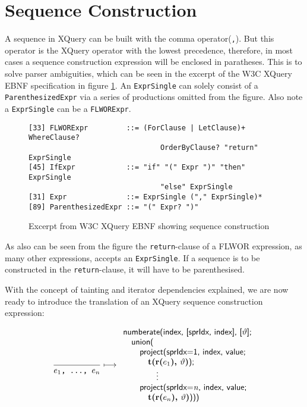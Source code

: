\section{Sequence Construction}
\label{sect:trans:TD:seqBuild}

A sequence in XQuery can be built with the comma operator(\texttt{,}). But this operator is the XQuery operator
with the lowest precedence, therefore, in most cases a sequence construction expression will be enclosed in
paratheses. This is to solve parser ambiguities, which can be seen in the excerpt of the W3C XQuery EBNF
specification\cite{w3c00} in figure \ref{fig:trans:TD:seqEBNF}. An \texttt{ExprSingle} can solely consist of a
\texttt{ParenthesizedExpr} via a series of productions omitted from the figure. Also note a \texttt{ExprSingle}
can be a \texttt{FLWORExpr}.

\begin{figure}[h]
\begin{Verbatim}
[33] FLWORExpr         ::= (ForClause | LetClause)+ WhereClause? 
                               OrderByClause? "return" ExprSingle
[45] IfExpr            ::= "if" "(" Expr ")" "then" ExprSingle 
                               "else" ExprSingle
[31] Expr              ::= ExprSingle ("," ExprSingle)*
[89] ParenthesizedExpr ::= "(" Expr? ")"
\end{Verbatim}
\caption[Excerpt from W3C XQuery EBNF]{Excerpt from W3C XQuery EBNF showing
sequence construction}
\label{fig:trans:TD:seqEBNF}
\end{figure}

As also can be seen from the figure the \texttt{return}-clause of a FLWOR expression, as many other expressions,
accepts an \texttt{ExprSingle}. If a sequence is to be constructed in the \texttt{return}-clause, it will have to
be parenthesised.

With the concept of tainting and iterator dependencies explained, we are now ready to introduce the translation of
an XQuery sequence construction expression:

\begin{equation}
\frac{}{e_{1}\mbox{\texttt{, \ldots, }}e_{n}}\longmapsto
\begin{array}{l}
\mbox{\textsf{numberate(index, [sprIdx, index], [}}\vartheta\mbox{\textsf{];}} \\ \quad
\mbox{\textsf{union(}} \\ \quad \quad
\mbox{\textsf{project(sprIdx=1, index, value; }} \\ \quad \quad \quad
\mbox{\textbf{t(r(}}e_{1}\mbox{\textbf{), }}\vartheta\mbox{\textbf{)}\textsf{);}} \\ \quad \quad
\qquad\vdots\\ \quad \quad
\mbox{\textsf{project(sprIdx=}\textit{n}\textsf{, index, value; }} \\ \quad \quad \quad
\mbox{\textbf{t(r(}}e_{n}\mbox{\textbf{), }}\vartheta\mbox{\textbf{)}\textsf{)))}}
\end{array}
\label{rule:trans:TD:seqConstr}
\end{equation}

